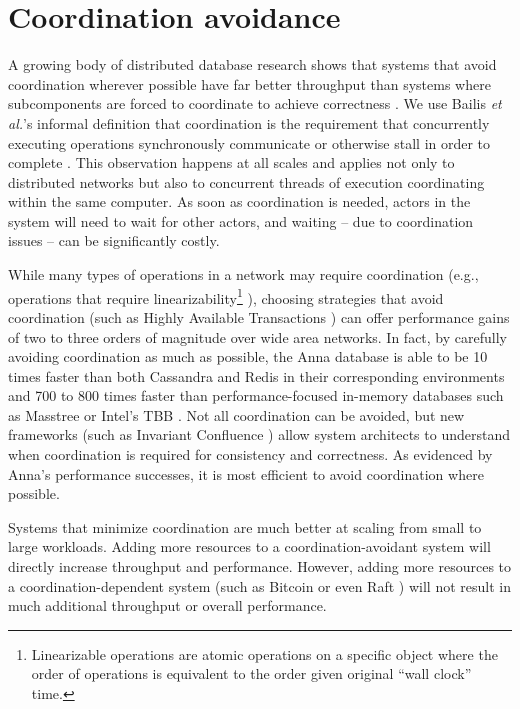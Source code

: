 \documentclass[11pt,fleqn,openany]{book}
\begin{document}
\section{Coordination avoidance}\label{sec:coordination-avoidance}

A growing body of distributed database research shows that systems that
avoid coordination wherever possible have far better throughput than systems
where subcomponents are forced to coordinate to achieve correctness
\cite{cap1, cap2, consistency-vs-latency, hat, i-confluence, anna,
calm1, calm2}.
We use Bailis {\em et al.}'s informal definition
that coordination is the requirement that concurrently executing operations
synchronously communicate or otherwise stall in order to complete
\cite{i-confluence}.
This observation happens at all scales and applies not only to distributed
networks but also to
concurrent threads of execution coordinating within the same computer.
As soon as coordination is needed, actors in the system will need to wait for
other actors, and waiting -- due to coordination issues -- can be significantly
costly.

While many types of operations in a network may require coordination
(e.g., operations that require linearizability\footnote{
Linearizable operations are atomic operations on a specific object where
the order of operations is equivalent to the order given original ``wall clock''
time.
}
\cite{jepsen-consistency, hat, vv-consistency}), choosing strategies that
avoid coordination (such as Highly Available Transactions \cite{hat}) can offer
performance gains of two to three orders of magnitude over wide area networks.
In fact, by carefully avoiding coordination as much as possible, the Anna
database is able to be 10 times faster than both Cassandra and Redis in their
corresponding environments and 700 to 800 times faster than
performance-focused in-memory databases such as Masstree or Intel's TBB
\cite{anna, anna-announce}.
Not all coordination can be avoided, but new frameworks (such as Invariant
Confluence \cite{i-confluence}) allow system architects to understand when
coordination is required for consistency and correctness. As evidenced
by Anna's performance successes, it is most efficient to avoid coordination
where possible.

Systems that minimize coordination are
much better at scaling from small
to large workloads. Adding more resources to a coordination-avoidant system
will directly increase throughput and performance. However,
adding more resources to a coordination-dependent system
(such as Bitcoin \cite{bitcoin} or even Raft \cite{raft}) will not result in
much additional throughput or overall performance.
\end{document}
